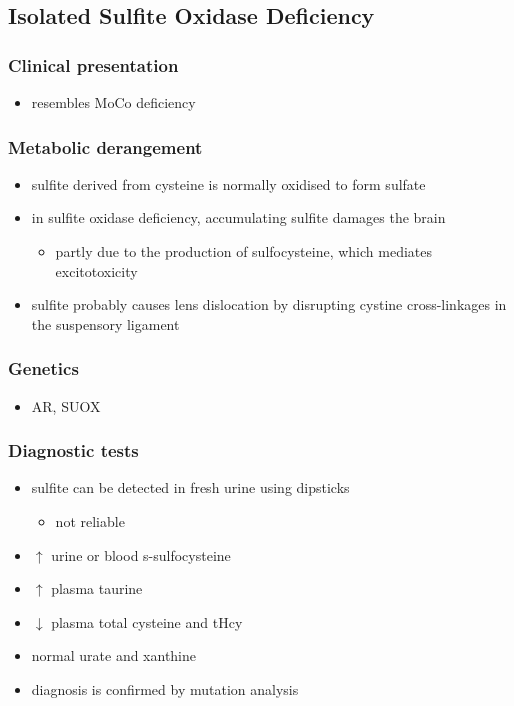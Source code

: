 \documentclass{scrartcl}
\begin{document}
\subsection{Isolated Sulfite Oxidase Deficiency}
\label{sec:org2efd13b}
\subsubsection{Clinical presentation}
\label{sec:orgd13a17d}
\begin{itemize}
\item resembles MoCo deficiency
\end{itemize}
\subsubsection{Metabolic derangement}
\label{sec:orgfec4cfe}
\begin{itemize}
\item sulfite derived from cysteine is normally oxidised to form
sulfate
\item in sulfite oxidase deficiency, accumulating sulfite damages the brain
\begin{itemize}
\item partly due to the production of sulfocysteine, which
mediates excitotoxicity
\end{itemize}
\item sulfite probably causes lens dislocation by disrupting cystine
cross-linkages in the suspensory ligament
\end{itemize}

\subsubsection{Genetics}
\label{sec:org1db9680}
\begin{itemize}
\item AR, SUOX
\end{itemize}

\subsubsection{Diagnostic tests}
\label{sec:orga87cf36}
\begin{itemize}
\item sulfite can be detected in fresh urine using dipsticks
\begin{itemize}
\item not reliable
\end{itemize}
\item \(\uparrow\) urine or blood s-sulfocysteine
\item \(\uparrow\) plasma taurine
\item \(\downarrow\) plasma total cysteine and tHcy
\item normal urate and xanthine
\item diagnosis is confirmed by mutation analysis
\end{itemize}
\end{document}
